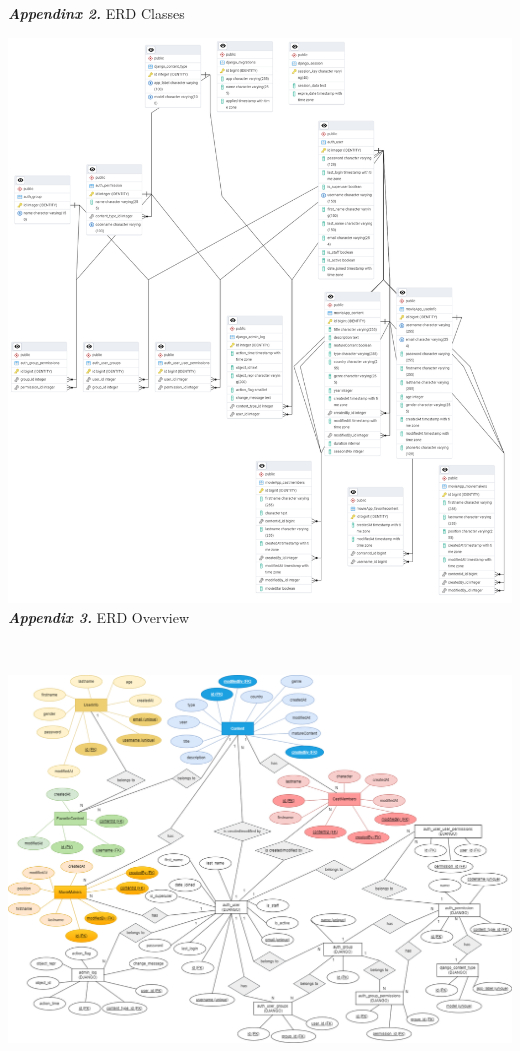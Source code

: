 \documentclass[letterpaper,twocolumn]{article}
\newcommand{\myparagraph}[1]{\vspace{0.1cm}\noindent \textbf{\textit{#1.}}}
\begin{document}
\clearpage
\myparagraph{Appendinx 2} ERD Classes

\includegraphics[scale=0.24]{images/ERDNewUpdated.png}\\[0.1cm] 

\clearpage
\myparagraph{Appendix 3} ERD Overview

\\\textbf{}

\includegraphics[scale=0.30]{images/WebTechERDNewUpdated.drawio.png}\\[0.1cm] 
\end{document}
